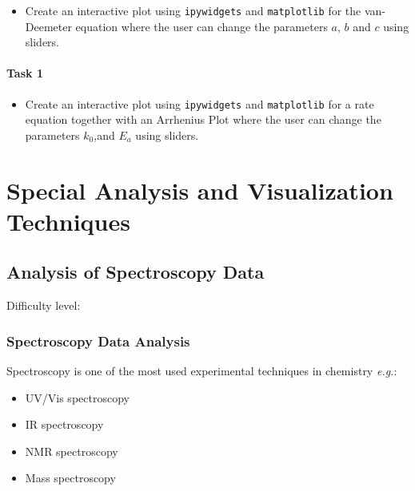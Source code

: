 \documentclass[
  letterpaper,
  DIV=11,
  numbers=noendperiod]{scrreprt}
\providecommand{\tightlist}{%
  \setlength{\itemsep}{0pt}\setlength{\parskip}{0pt}}\usepackage{longtable,booktabs,array}
\begin{document}
\begin{itemize}
\tightlist
\item
  Create an interactive plot using \texttt{ipywidgets} and
  \texttt{matplotlib} for the van-Deemeter equation where the user can
  change the parameters \(a\), \(b\) and \(c\) using sliders.
\end{itemize}

\subsection{Task 1}\label{task-1-2}

\begin{itemize}
\tightlist
\item
  Create an interactive plot using \texttt{ipywidgets} and
  \texttt{matplotlib} for a rate equation together with an Arrhenius
  Plot where the user can change the parameters \(k_0\),and \(E_a\)
  using sliders.
\end{itemize}

\part{Special Analysis and Visualization Techniques}

\chapter{Analysis of Spectroscopy
Data}\label{analysis-of-spectroscopy-data}

Difficulty level: { }

\section*{Spectroscopy Data Analysis}\label{spectroscopy-data-analysis}


Spectroscopy is one of the most used experimental techniques in
chemistry \emph{e.g.}:

\begin{itemize}
\tightlist
\item
  UV/Vis spectroscopy
\item
  IR spectroscopy
\item
  NMR spectroscopy
\item
  Mass spectroscopy
\end{itemize}
\end{document}
